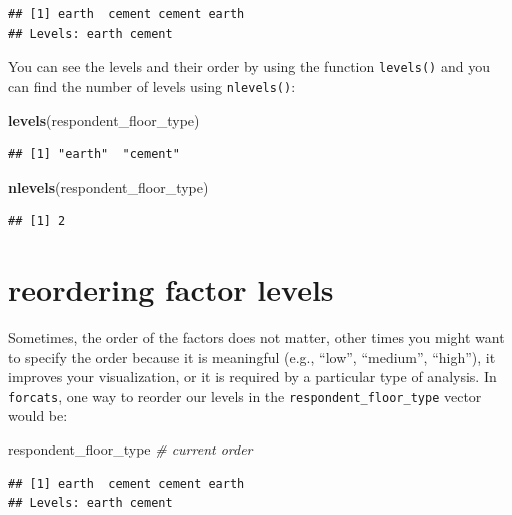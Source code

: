 \documentclass[]{book}
\newenvironment{Shaded}{\begin{snugshade}}{\end{snugshade}}
\newcommand{\KeywordTok}[1]{\textcolor[rgb]{0.13,0.29,0.53}{\textbf{#1}}}
\newcommand{\CommentTok}[1]{\textcolor[rgb]{0.56,0.35,0.01}{\textit{#1}}}
\newcommand{\NormalTok}[1]{#1}
\begin{document}
\begin{verbatim}
## [1] earth  cement cement earth 
## Levels: earth cement
\end{verbatim}

You can see the levels and their order by using the function
\texttt{levels()} and you can find the number of levels using
\texttt{nlevels()}:

\begin{Shaded}
\begin{Highlighting}[]
\KeywordTok{levels}\NormalTok{(respondent_floor_type)}
\end{Highlighting}
\end{Shaded}

\begin{verbatim}
## [1] "earth"  "cement"
\end{verbatim}

\begin{Shaded}
\begin{Highlighting}[]
\KeywordTok{nlevels}\NormalTok{(respondent_floor_type)}
\end{Highlighting}
\end{Shaded}

\begin{verbatim}
## [1] 2
\end{verbatim}

\section{reordering factor levels}\label{reordering-factor-levels}

Sometimes, the order of the factors does not matter, other times you
might want to specify the order because it is meaningful (e.g., ``low'',
``medium'', ``high''), it improves your visualization, or it is required
by a particular type of analysis. In \texttt{forcats}, one way to
reorder our levels in the \texttt{respondent\_floor\_type} vector would
be:

\begin{Shaded}
\begin{Highlighting}[]
\NormalTok{respondent_floor_type }\CommentTok{# current order}
\end{Highlighting}
\end{Shaded}

\begin{verbatim}
## [1] earth  cement cement earth 
## Levels: earth cement
\end{verbatim}
\end{document}
